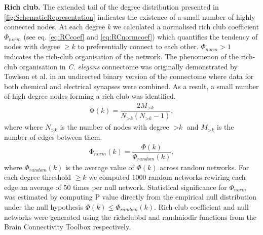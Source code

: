 \documentclass[10pt,letterpaper]{article}
\begin{document}
\textbf{Rich club.} The extended tail of the degree distribution presented in \ref{fig:SchematicRepresentation} indicates the existence of a small number of highly connected nodes. 
At each degree \textit{k} we calculated a normalised rich club coefficient $\Phi_{\textit{norm}}$ (see eq. \ref{eq:RCcoef} and \ref{eq:RCnormcoef}) which quantifies the tendency of nodes with degree $\geq k$ to preferentially connect to each other. 
$\Phi_{norm}> 1$ indicates the rich-club organisation of the network. 
The phenomenon of the rich-club organisation in \textit{C. elegans} connectome was originally demonstrated by Towlson et al. \cite{Towlson2013} in an undirected binary version of the connectome where data for both chemical and electrical synapses were combined.
As a result, a small number of high degree nodes forming a rich club was identified.   
 	\begin{eqnarray}
	\label{eq:RCcoef}
     \mathrm{\Phi(\textit{k})} = \dfrac{2M_{>\textit{k}}}{N_{>\textit{k}}(N_{>\textit{k}}-1)}, 
	 \end{eqnarray}
where where $N_{>\textit{k}}$ is the number of nodes with degree $>\textit{k}$ and $M_{>\textit{k}}$ is the number of edges between them. 
\begin{eqnarray}
	\label{eq:RCnormcoef}
     \mathrm{\Phi_{\textit{norm}}(\textit{k})} = \dfrac{\Phi(\textit{k})}{\Phi_{\textit{random}}(\textit{k})}, 
	 \end{eqnarray}
where $\Phi_{\textit{random}}(\textit{k})$ is the average value of $\Phi(\textit{k})$ across random networks.
For each degree threshold $\geq k$ we computed 1000 random networks rewiring each edge an average of 50 times per null network. 
Statistical significance for $\Phi_{norm}$ was estimated by computing P value directly from the empirical null distribution under the null hypothesis $\Phi(\textit{k}) \leq \Phi_{\textit{random}}(\textit{k})$. 
Rich club coefficient and null networks were generated using the rich\textunderscore club\textunderscore bd and randmio\textunderscore dir functions from the Brain Connectivity Toolbox \cite{Rubinov2010} respectively.
\end{document}
